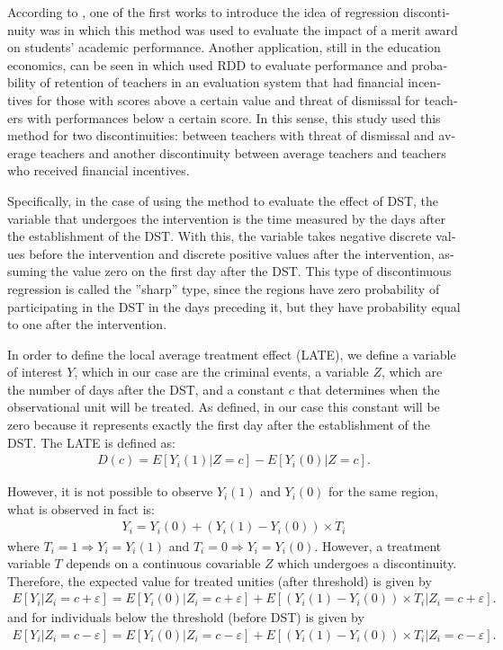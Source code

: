 \documentclass[12pt,openright,oneside,a4paper,english,french,spanish]{abntex2}
\numberwithin{table}{section} %
\numberwithin{figure}{section} %
\newcommand{\co}{\citeonline}
\begin{document}
\begin{otherlanguage}{english}
According to \co{filhonaercio2012}, one of the first works to introduce the idea of regression discontinuity was \co{thistlewaite1960} in which this method was used to evaluate the impact of a merit award on students' academic performance. Another application, still in the education economics, can be seen in \co{dee2013} which used RDD to evaluate performance and probability of retention of teachers in an evaluation system that had financial incentives for those with scores above a certain value and threat of dismissal for teachers with performances below a certain score. In this sense, this study used this method for two discontinuities: between teachers with threat of dismissal and average teachers and another discontinuity between average teachers and teachers who received financial incentives.

Specifically, in the case of using the method to evaluate the effect of DST, the variable that undergoes the intervention is the time measured by the days after the establishment of the DST. With this, the variable takes negative discrete values before the intervention and discrete positive values after the intervention, assuming the value zero on the first day after the DST. This type of discontinuous regression is called the ''sharp'' type, since the regions have zero probability of participating in the DST in the days preceding it, but they have probability equal to one after the intervention.

In order to define the local average treatment effect (LATE), we define a variable of interest $Y$, which in our case are the criminal events, a variable $Z$, which are the number of days after the DST, and a constant $c$ that determines when the observational unit will be treated. As defined, in our case this constant will be zero because it represents exactly the first day after the establishment of the DST. The LATE is defined as:
\begin{align*}
D\left ( c \right )=E\left [ Y_i\left ( 1 \right )|Z=c \right ]-E\left [ Y_i\left ( 0 \right )|Z=c \right ].
\end{align*}

However, it is not possible to observe $Y_i(1)$ and $Y_i(0)$ for the same region, what is observed in fact is:
\begin{align*}
Y_i = Y_i(0) + (Y_i(1) - Y_i(0))\times T_i
\end{align*}
where $T_i = 1 \Rightarrow Y_i=Y_i(1)$ and $T_i = 0 \Rightarrow Y_i=Y_i(0)$. However, a treatment variable $T$ depends on a continuous covariable $Z$ which undergoes a discontinuity. Therefore, the expected value for treated unities (after threshold) is given by
\begin{align*}
E[Y_i|Z_i=c+\varepsilon]=E[Y_i(0)|Z_i=c+\varepsilon]+E[(Y_i(1)-Y_i(0))\times T_i|Z_i=c+\varepsilon].
\end{align*} and for individuals below the threshold (before DST) is given by
\begin{align*}
E[Y_i|Z_i=c-\varepsilon]=E[Y_i(0)|Z_i=c-\varepsilon]+E[(Y_i(1)-Y_i(0))\times T_i|Z_i=c-\varepsilon].
\end{align*}


\end{otherlanguage}
\end{document}
